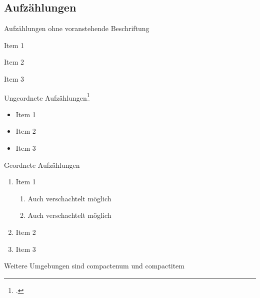 \subsection{Aufzählungen}\label{subsec:lists}
	
Aufzählungen ohne voranstehende Beschriftung\autocite{einstein2}
	
\begin{description}
	\item{Item 1}
	\item{Item 2}
	\item{Item 3}
\end{description}
	
Ungeordnete Aufzählungen\footcite{gates}
	
\begin{itemize}
	\item{Item 1}
	\item{Item 2}
	\item{Item 3}
\end{itemize}
	
Geordnete Aufzählungen 
	
\begin{enumerate} %
	\item{Item 1}
	\begin{enumerate}
		\item Auch verschachtelt möglich
		\item Auch verschachtelt möglich
	\end{enumerate}
	\item{Item 2}
	\item{Item 3}
\end{enumerate}
	
Weitere Umgebungen sind compactenum und compactitem
